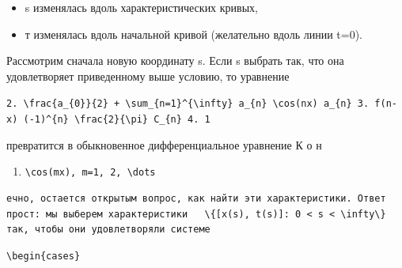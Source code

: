 \documentclass[
  ukrainian,
]{article}
\providecommand{\tightlist}{%
  \setlength{\itemsep}{0pt}\setlength{\parskip}{0pt}}
\begin{document}
\begin{itemize}
\item
  s изменялась вдоль характеристических кривых,
\item
  т изменялась вдоль начальной кривой (желательно вдоль линии t=0).
\end{itemize}

Рассмотрим сначала новую координату s. Если s выбрать так, что она
удовлетворяет приведенному выше условию, то уравнение

\texttt{2.\ \textquotesingle{}\textbackslash{}frac\{a\_\{0\}\}\{2\}\ +\ \textbackslash{}sum\_\{n=1\}\^{}\{\textbackslash{}infty\}\ a\_\{n\}\ \textbackslash{}cos(nx)\textquotesingle{}\ \textquotesingle{}a\_\{n\}\textquotesingle{}\ 3.\ \textquotesingle{}f(n-x)\textquotesingle{}\ \textquotesingle{}(-1)\^{}\{n\}\ \textbackslash{}frac\{2\}\{\textbackslash{}pi\}\ C\_\{n\}\textquotesingle{}\ 4.\ 1}

превратится в обыкновенное дифференциальное уравнение К о н

\begin{enumerate}
\def\labelenumi{\arabic{enumi}.}
\setcounter{enumi}{4}
\tightlist
\item
  \texttt{\textbackslash{}cos(mx),\ m=1,\ 2,\ \textbackslash{}dots}
\end{enumerate}

\begin{verbatim}
ечно, остается открытым вопрос, как найти эти характеристики. Ответ прост: мы выберем характеристики   \{[x(s), t(s)]: 0 < s < \infty\}   так, чтобы они удовлетворяли системе
\end{verbatim}

\begin{verbatim}
\begin{cases}
\end{verbatim}
\end{document}
